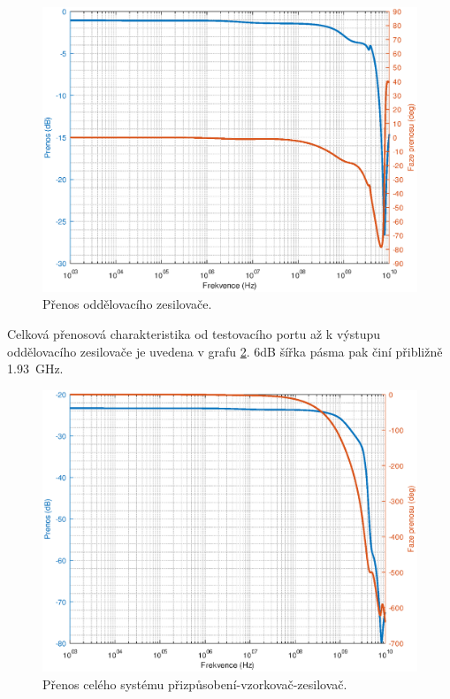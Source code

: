 \begin{figure}[htbp]
\includegraphics[width=\textwidth,keepaspectratio]{images/frequency_transfer_function_BF.eps}\caption{Přenos oddělovacího zesilovače.}\label{frequency_transfer_function_bf}
\end{figure}

Celková přenosová charakteristika od testovacího portu až k výstupu oddělovacího zesilovače je uvedena v grafu \ref{frequency_transfer_function_all}. 6\si{\deci\bel} šířka pásma pak činí přibližně \SI{1.93}{\giga\hertz}.

\begin{figure}[htbp]
\includegraphics[width=\textwidth,keepaspectratio]{images/frequency_transfer_function_all.eps}\caption{Přenos celého systému přizpůsobení-vzorkovač-zesilovač.}\label{frequency_transfer_function_all}
\end{figure}

